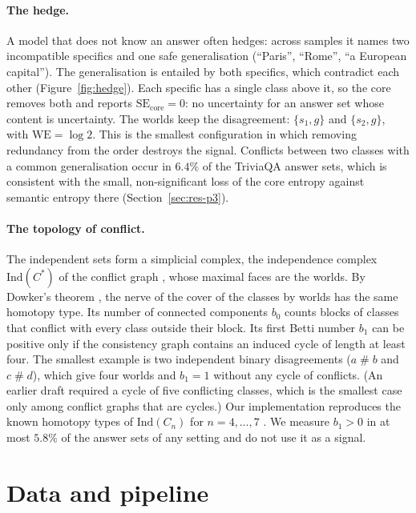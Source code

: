 \documentclass[english]{desafiokunumi}
\theoremstyle{definition}
\theoremstyle{remark}
\newcommand{\SEc}{\mathrm{SE}_{\mathrm{core}}}
\newcommand{\WE}{\mathrm{WE}}
\newcommand{\Ind}{\mathrm{Ind}}
\newcommand{\cf}{\mathrel{\#}}
\begin{document}
\paragraph{The hedge.} A model that does not know an answer often hedges:
across samples it names two incompatible specifics and one safe generalisation
(``Paris'', ``Rome'', ``a European capital''). The generalisation is entailed
by both specifics, which contradict each other (Figure~\ref{fig:hedge}). Each
specific has a single class above it, so the core removes both and reports
$\SEc = 0$: no uncertainty for an answer set whose content is uncertainty. The
worlds keep the disagreement: $\{s_1, g\}$ and $\{s_2, g\}$, with
$\WE = \log 2$. This is the smallest configuration in which removing
redundancy from the order destroys the signal. Conflicts between two classes
with a common generalisation occur in $6.4\%$ of the TriviaQA answer sets,
which is consistent with the small, non-significant loss of the core entropy
against semantic entropy there (Section~\ref{sec:res-p3}).

\paragraph{The topology of conflict.} The independent sets form a simplicial
complex, the independence complex $\Ind(C^*)$ of the conflict graph
\citep{kozlov2008combinatorial}, whose maximal faces are the worlds. By
Dowker's theorem \citep{dowker1952homology}, the nerve of the cover of the
classes by worlds has the same homotopy type. Its number of connected
components $b_0$ counts blocks of classes that conflict with every class
outside their block. Its first Betti number $b_1$ can be positive only if the
consistency graph contains an induced cycle of length at least four. The
smallest example is two independent binary disagreements ($a \cf b$ and
$c \cf d$), which give four worlds and $b_1 = 1$ without any cycle of
conflicts. (An earlier draft required a cycle of five conflicting classes,
which is the smallest case only among conflict graphs that are cycles.) Our implementation reproduces the known
homotopy types of $\Ind(C_n)$ for $n = 4, \dots, 7$
\citep{kozlov2008combinatorial}. We measure $b_1 > 0$ in at most $5.8\%$ of
the answer sets of any setting and do not use it as a signal.

\section{Data and pipeline}
\label{sec:dados}
\end{document}
